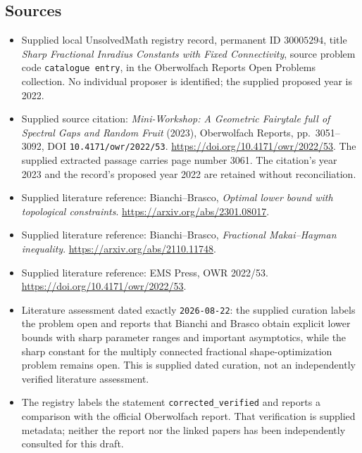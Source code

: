\documentclass[11pt]{article}
\begin{document}
\subsection{Sources}
\begin{itemize}
\item Supplied local UnsolvedMath registry record, permanent ID \(30005294\), title \emph{Sharp Fractional Inradius Constants with Fixed Connectivity}, source problem code \texttt{catalogue entry}, in the Oberwolfach Reports Open Problems collection. No individual proposer is identified; the supplied proposed year is 2022.
\item Supplied source citation: \emph{Mini-Workshop: A Geometric Fairytale full of Spectral Gaps and Random Fruit} (2023), Oberwolfach Reports, pp.~3051--3092, DOI \texttt{10.4171/owr/2022/53}. \url{https://doi.org/10.4171/owr/2022/53}. The supplied extracted passage carries page number 3061. The citation's year 2023 and the record's proposed year 2022 are retained without reconciliation.
\item Supplied literature reference: Bianchi--Brasco, \emph{Optimal lower bound with topological constraints}. \url{https://arxiv.org/abs/2301.08017}.
\item Supplied literature reference: Bianchi--Brasco, \emph{Fractional Makai--Hayman inequality}. \url{https://arxiv.org/abs/2110.11748}.
\item Supplied literature reference: EMS Press, OWR 2022/53. \url{https://doi.org/10.4171/owr/2022/53}.
\item Literature assessment dated exactly \texttt{2026-08-22}: the supplied curation labels the problem open and reports that Bianchi and Brasco obtain explicit lower bounds with sharp parameter ranges and important asymptotics, while the sharp constant for the multiply connected fractional shape-optimization problem remains open. This is supplied dated curation, not an independently verified literature assessment.
\item The registry labels the statement \texttt{corrected\_verified} and reports a comparison with the official Oberwolfach report. That verification is supplied metadata; neither the report nor the linked papers has been independently consulted for this draft.
\end{itemize}
\end{document}
